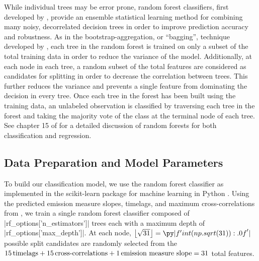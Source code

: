 While individual trees may be error prone, random forest classifiers, first developed by \citet{breiman_random_2001}, provide an ensemble statistical learning method for combining many noisy, decorrelated decision trees in order to improve prediction accuracy and robustness. As in the bootstrap-aggregation, or ``bagging'', technique developed by \citet{breiman_bagging_1996}, each tree in the random forest is trained on only a subset of the total training data in order to reduce the variance of the model. Additionally, at each node in each tree, a random subset of the total features are considered as candidates for splitting in order to decrease the correlation between trees. This further reduces the variance and prevents a single feature from dominating the decision in every tree. Once each tree in the forest has been built using the training data, an unlabeled observation is classified by traversing each tree in the forest and taking the majority vote of the class at the terminal node of each tree. See chapter 15 of \citet{hastie_elements_2009} for a detailed discussion of random forests for both classification and regression.

\subsection{Data Preparation and Model Parameters}\label{sec:data-prep}

To build our classification model, we use the random forest classifier as implemented in the scikit-learn package for machine learning in Python \citep{pedregosa_scikit-learn_2011}. Using the predicted emission measure slopes, timelags, and maximum cross-correlations from , we train a single random forest classifier composed of \py[manager_ml]|rf_options['n_estimators']| trees each with a maximum depth of \py[manager_ml]|rf_options['max_depth']|. At each node, $\left\lfloor\sqrt{31}\right\rfloor=\py|f'{int(np.sqrt(31)):.0f}'|$ possible split candidates are randomly selected from the $15\,\textup{timelags} + 15\,\textup{cross-correlations} + 1\,\textup{emission measure slope}=31$ total features.


